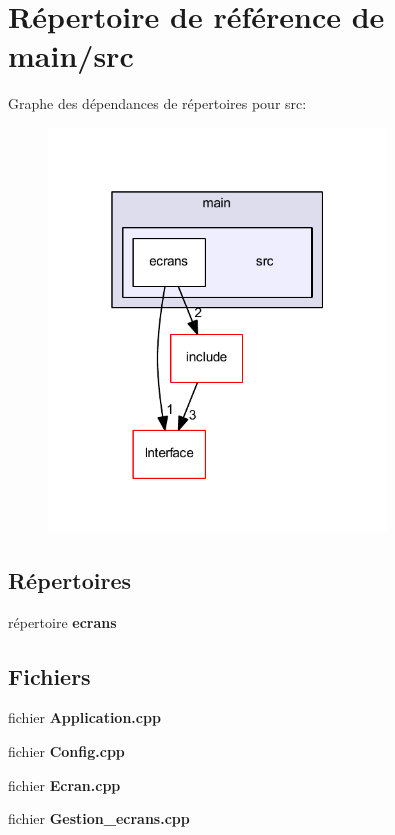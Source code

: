 \section{Répertoire de référence de main/src}
\label{dir_2101cd0b22112584ff59816a4bc911f7}
Graphe des dépendances de répertoires pour src\+:\nopagebreak
\begin{figure}[H]
\begin{center}
\leavevmode
\includegraphics[width=254pt]{dir_2101cd0b22112584ff59816a4bc911f7_dep}
\end{center}
\end{figure}
\subsection*{Répertoires}
\begin{DoxyCompactItemize}
\item 
répertoire {\bf ecrans}
\end{DoxyCompactItemize}
\subsection*{Fichiers}
\begin{DoxyCompactItemize}
\item 
fichier {\bf Application.\+cpp}
\item 
fichier {\bf Config.\+cpp}
\item 
fichier {\bf Ecran.\+cpp}
\item 
fichier {\bf Gestion\+\_\+ecrans.\+cpp}
\end{DoxyCompactItemize}
